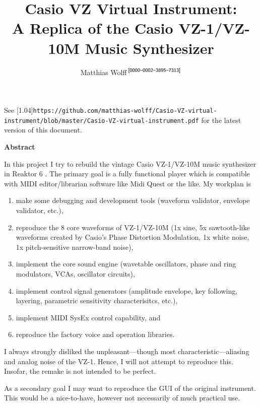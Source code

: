 \documentclass[a4paper]{article}
\newcommand{\TT}[1]{\protect\scalebox{0.75}[1.04]{\texttt{#1}}}
\begin{document}
%
\author{Matthias Wolff$^{\text{\sf\,[0000--0002--3895--7313]}}$}
\title{Casio VZ Virtual Instrument:\\
A Replica of the Casio VZ-1/VZ-10M Music Synthesizer}
\maketitle

\bigskip\noindent
See \TT{https://github.com/matthias-wolff/Casio-VZ-virtual-instrument/blob/master/Casio-VZ-virtual-instrument.pdf}
for the latest version of this document.
\begin{center}
  \bigskip\bigskip
  \begin{minipage}{0.9\linewidth}
    \textbf{Abstract}

    \bigskip
In this project I try to rebuild the vintage Casio VZ-1/VZ-10M music synthesizer
in Reaktor 6 \cite{Reaktor6}. The primary goal is a fully functional player
which is compatible with MIDI editor/librarian software like Midi Quest
\cite{MidiQuest12} or the like. My workplan is
\begin{enumerate}   
  \item 
    make some debugging and development tools (waveform validator, envelope
    validator, etc.),
  \item
    reproduce the 8 core waveforms of VZ-1/VZ-10M (1x sine, 5x sawtooth-like
    waveforms created by Casio's Phase Distortion Modulation, 1x white noise, 1x
    pitch-sensitive narrow-band noise),
  \item
    implement the core sound engine (wavetable oscillators, phase and ring
    modulators, VCAs, oscillator circuits),
  \item
    implement control signal generators (amplitude envelope, key following,
    layering, parametric sensitivity characterisitcs, etc.),
  \item
    implement MIDI SysEx control capability, and
  \item
    reproduce the factory voice and operation libraries.
\end{enumerate}
I always strongly disliked the unpleasant---though most
characteristic---aliasing and analog noise of the VZ-1. Hence, I will not
attempt to reproduce this. Insofar, the remake is not intended to be perfect.

As a secondary goal I may want to reproduce the GUI of the original instrument.
This would be a nice-to-have, however not necessarily of much practical use.

  \end{minipage}
  \vfill
  \vfill
\end{center}
\clearpage
\end{document}
